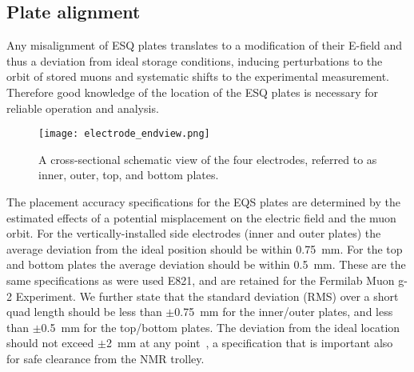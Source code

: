 \subsection*{Plate alignment}

Any misalignment of ESQ plates translates to a modification of their E-field and thus a deviation from ideal storage conditions, inducing perturbations to the orbit of stored muons and systematic shifts to the experimental measurement. 
Therefore good knowledge of the location of the ESQ plates is necessary for reliable operation and analysis.



\begin{wrapfigure}{rt}{0.6\textwidth}
	\centering
	\texttt{[image: electrode\_endview.png]}
	\caption{A cross-sectional schematic view of the four electrodes, referred to as inner, outer, top, and bottom plates.}\label{fig:electrode_endview}
\end{wrapfigure}



The placement accuracy specifications for the EQS plates are determined by the estimated effects of a potential misplacement on the electric field and the muon orbit. For the vertically-installed side electrodes (inner and outer plates) the average deviation from the ideal position should be within \SI{0.75}{mm}. For the top and bottom plates the average deviation should be within \SI{0.5}{mm}. 
These are the same specifications as were used E821, and are retained for the Fermilab Muon g-2 Experiment.
We further state that the standard deviation (RMS) over a short quad length should be less than $\pm$\SI{0.75}{mm} for the inner/outer plates, and less than $\pm$\SI{0.5}{mm} for the top/bottom plates.
The deviation from the ideal location should not exceed $\pm$\SI{2}{mm} at any point~\cite{Grange:doc3632}, a specification that is important also for safe clearance from the NMR trolley.


